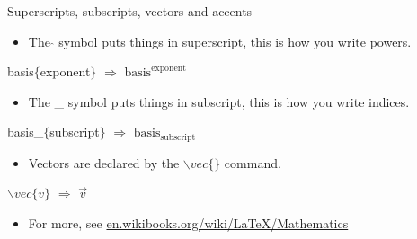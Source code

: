 \documentclass[usenames,dvipsnames,aspectratio=169]{beamer}
\newcommand{\aitem}{\item[$\cdot$]}
\begin{document}

\begin{frame}[t]{Superscripts, subscripts, vectors and accents}
\begin{itemize}
\aitem The $\hat{}$ symbol puts things in superscript, this is how you write powers.
\end{itemize}
\textcolor{PineGreen}{basis$\hat{}\{$exponent$\}$} $\Rightarrow$ $\text{basis}^\text{exponent}$
\begin{itemize}
\aitem The \_ symbol puts things in subscript, this is how you write indices.
\end{itemize}
\textcolor{PineGreen}{basis\_$\{$subscript$\}$} $\Rightarrow$ $\text{basis}_\text{subscript}$
\begin{itemize}
\aitem Vectors are declared by the $\backslash vec\{\}$ command.
\end{itemize}
\textcolor{PineGreen}{$\backslash vec\{v\}$} $\Rightarrow$ $\vec{v}$
\begin{itemize}
\aitem For more, see \textcolor{blue}{\url{en.wikibooks.org/wiki/LaTeX/Mathematics}}
\end{itemize}
\end{frame}


%
\end{document}
